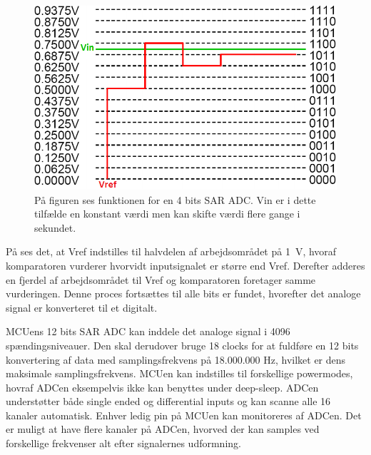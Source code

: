 \begin{figure}[H]
	\centering
	\includegraphics[scale=0.52]{figures/bProblemloesning/SAR_ADC.png}
	\caption{På figuren ses funktionen for en 4 bits SAR ADC. Vin er i dette tilfælde en konstant værdi men kan skifte værdi flere gange i sekundet.}
	\label{fig:SAR_ADC}
\end{figure}\vspace{-0.5cm}
På  ses det, at Vref indstilles til halvdelen af arbejdsområdet på 1~V, hvoraf komparatoren vurderer hvorvidt inputsignalet er større end Vref. Derefter adderes en fjerdel af arbejdsområdet til Vref og komparatoren foretager samme vurderingen. Denne proces fortsættes til alle bits er fundet, hvorefter det analoge signal er konverteret til et digitalt.

MCUens 12 bits SAR ADC kan inddele det analoge signal i 4096 spændingsniveauer. Den skal derudover bruge 18 clocks for at fuldføre en 12 bits konvertering af data med samplingsfrekvens på 18.000.000 Hz, hvilket er dens maksimale samplingsfrekvens. MCUen kan indstilles til forskellige powermodes, hovraf ADCen eksempelvis ikke kan benyttes under deep-sleep. \newline 
ADCen understøtter både single ended og differential inputs og kan scanne alle 16 kanaler automatisk. Enhver ledig pin på MCUen kan monitoreres af ADCen. Det er muligt at have flere kanaler på ADCen, hvorved der kan samples ved forskellige frekvenser alt efter signalernes udformning. \citep{Semiconductor20164200M}

